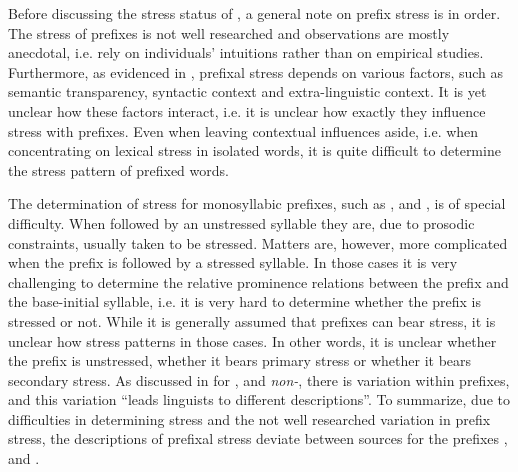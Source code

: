 Before discussing the stress status of , a general note on prefix stress is in order. The stress of prefixes is not well researched and observations are mostly anecdotal, i.e. rely on individuals' intuitions rather than on empirical studies. Furthermore, as evidenced in \cite{Videau.2015}, prefixal stress depends on various factors, such as semantic transparency, syntactic context and extra-linguistic context. It is yet unclear how these factors interact, i.e. it is unclear how exactly they influence stress with prefixes.
Even when leaving contextual influences aside, i.e. when concentrating on lexical stress in isolated words, it is quite difficult to determine the stress pattern of prefixed words. 

The determination of stress for monosyllabic prefixes, such as ,  and , is of special difficulty. When followed by an unstressed syllable they are, due to prosodic constraints, usually taken to be stressed. Matters are, however, more complicated when the prefix is followed by a stressed syllable. In those cases it is very challenging to determine the relative prominence relations between the prefix and the base-initial syllable, i.e. it is very hard to determine whether the prefix is stressed or not. 
While it is generally assumed that prefixes can bear stress, it is unclear how stress patterns in those cases. In other words, it is unclear whether the prefix is unstressed, whether it bears primary stress or whether it bears secondary stress. As discussed in \citet[126]{Okada.2013} for ,  and \textit{non-}, there is variation within prefixes, and this variation ``leads linguists to different descriptions''. 
To summarize, due to difficulties in determining stress and the not well researched variation in prefix stress, the descriptions of prefixal stress deviate between sources for the prefixes ,  and . %


